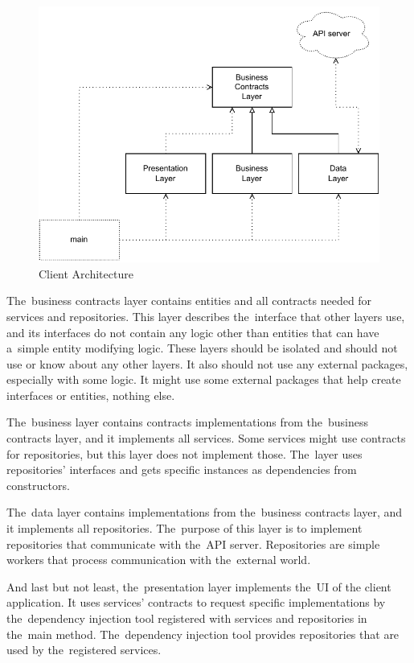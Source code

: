 \begin{figure}
    \centering
    \includegraphics[width=1\linewidth]{assets/design/clientarchitecture.pdf}
    \caption{Client Architecture}
    \label{fig:design:clientarchitecture}
\end{figure}

The~business contracts layer contains entities and all contracts needed for services and repositories.
This layer describes the~interface that other layers use, and its interfaces do not contain any logic other than entities that can have a~simple entity modifying logic.
These layers should be isolated and should not use or know about any other layers.
It also should not use any external packages, especially with some logic.
It might use some external packages that help create interfaces or entities, nothing else.

The~business layer contains contracts implementations from the~business contracts layer, and it implements all services.
Some services might use contracts for repositories, but this layer does not implement those.
The~layer uses repositories' interfaces and gets specific instances as dependencies from constructors.

The~data layer contains implementations from the~business contracts layer, and it implements all repositories.
The~purpose of this layer is to implement repositories that communicate with the~API server.
Repositories are simple workers that process communication with the~external world.

And last but not least, the~presentation layer implements the~UI of the client application.
It uses services' contracts to request specific implementations by the~dependency injection tool registered with services and repositories in the~main method.
The~dependency injection tool provides repositories that are used by the~registered services.

